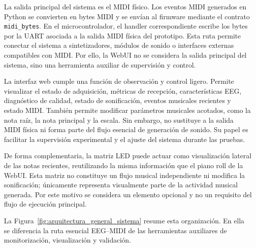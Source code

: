 \documentclass[../main.tex]{subfiles}
\begin{document}
La salida principal del sistema es el MIDI físico. Los eventos MIDI generados en Python se convierten en bytes MIDI y se envían al firmware mediante el contrato \texttt{midi\_bytes}. En el microcontrolador, el handler correspondiente escribe los bytes por la UART asociada a la salida MIDI física del prototipo. Esta ruta permite conectar el sistema a sintetizadores, módulos de sonido o interfaces externas compatibles con MIDI. Por ello, la WebUI no se considera la salida principal del sistema, sino una herramienta auxiliar de supervisión y control.

La interfaz web cumple una función de observación y control ligero. Permite visualizar el estado de adquisición, métricas de recepción, características EEG, diagnóstico de calidad, estado de sonificación, eventos musicales recientes y estado MIDI. También permite modificar parámetros musicales acotados, como la nota raíz, la nota principal y la escala. Sin embargo, no sustituye a la salida MIDI física ni forma parte del flujo esencial de generación de sonido. Su papel es facilitar la supervisión experimental y el ajuste del sistema durante las pruebas.

De forma complementaria, la matriz LED puede actuar como visualización lateral de las notas recientes, reutilizando la misma información que el piano roll de la WebUI. Esta matriz no constituye un flujo musical independiente ni modifica la sonificación; únicamente representa visualmente parte de la actividad musical generada. Por este motivo se considera un elemento opcional y no un requisito del flujo de ejecución principal.

La Figura~\ref{fig:arquitectura_general_sistema} resume esta organización. En ella se diferencia la ruta esencial EEG--MIDI de las herramientas auxiliares de monitorización, visualización y validación.
\end{document}
